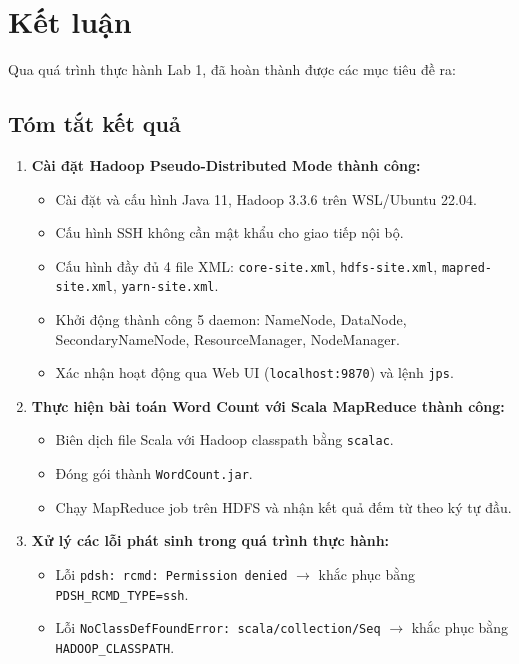 \section{Kết luận}
\label{sec:conclusion}

Qua quá trình thực hành Lab 1, đã hoàn thành được các mục tiêu đề ra:

\subsection{Tóm tắt kết quả}

\begin{enumerate}
    \item \textbf{Cài đặt Hadoop Pseudo-Distributed Mode thành công:}
    \begin{itemize}
        \item Cài đặt và cấu hình Java 11, Hadoop 3.3.6 trên WSL/Ubuntu 22.04.
        \item Cấu hình SSH không cần mật khẩu cho giao tiếp nội bộ.
        \item Cấu hình đầy đủ 4 file XML: \texttt{core-site.xml}, \texttt{hdfs-site.xml}, \texttt{mapred-site.xml}, \texttt{yarn-site.xml}.
        \item Khởi động thành công 5 daemon: NameNode, DataNode, SecondaryNameNode, ResourceManager, NodeManager.
        \item Xác nhận hoạt động qua Web UI (\texttt{localhost:9870}) và lệnh \texttt{jps}.
    \end{itemize}

    \item \textbf{Thực hiện bài toán Word Count với Scala MapReduce thành công:}
    \begin{itemize}
        \item Biên dịch file Scala với Hadoop classpath bằng \texttt{scalac}.
        \item Đóng gói thành \texttt{WordCount.jar}.
        \item Chạy MapReduce job trên HDFS và nhận kết quả đếm từ theo ký tự đầu.
    \end{itemize}

    \item \textbf{Xử lý các lỗi phát sinh trong quá trình thực hành:}
    \begin{itemize}
        \item Lỗi \texttt{pdsh: rcmd: Permission denied} $\rightarrow$ khắc phục bằng \texttt{PDSH\_RCMD\_TYPE=ssh}.
        \item Lỗi \texttt{NoClassDefFoundError: scala/collection/Seq} $\rightarrow$ khắc phục bằng \texttt{HADOOP\_CLASSPATH}.
    \end{itemize}
\end{enumerate}

